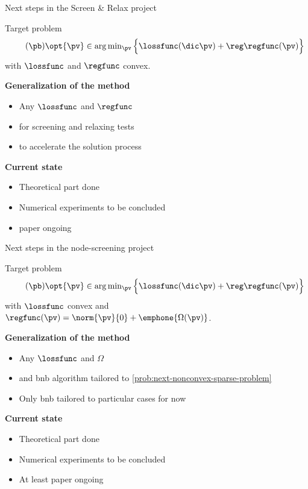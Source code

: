 \begin{frame}{Next steps in the Screen \& Relax project}
  \begin{block}{Target problem}
    \begin{equation}
      \label{prob:next-convex-sparse-problem}
      \tag{$\pb$}
      \opt{\pv} \in \textstyle\arg\min_{\pv} \Big\{ \lossfunc(\dic\pv) + \reg\regfunc(\pv) \Big\}
    \end{equation}
    with $\lossfunc$ and $\regfunc$ convex.
  \end{block}
  \pause
  \textbf{Generalization of the method}
  \begin{itemize}
    \item Any  $\lossfunc$ and $\regfunc$
    \pause
    \item {} for screening and relaxing tests
    \pause
    \item {} to accelerate the solution process
  \end{itemize}
  \pause
  \textbf{Current state}
  \begin{itemize}
    \item Theoretical part done
    \pause
    \item Numerical experiments to be concluded
    \pause
    \item {} paper ongoing
  \end{itemize}
\end{frame}

\begin{frame}{Next steps in the node-screening project}
  \begin{block}{Target problem}
    \begin{equation}
      \label{prob:next-nonconvex-sparse-problem}
      \tag{$\pb$}
      \opt{\pv} \in \textstyle\arg\min_{\pv} \Big\{ \lossfunc(\dic\pv) + \reg\regfunc(\pv) \Big\}
    \end{equation}
    with $\lossfunc$ convex and $\regfunc(\pv) = \norm{\pv}{0} + \emphone{\Omega(\pv)}$.
  \end{block}
  \pause
  \textbf{Generalization of the method}
  \begin{itemize}
    \item Any  $\lossfunc$ and $\Omega$
    \pause
    \item {} and  \gls{bnb} algorithm tailored to \eqref{prob:next-nonconvex-sparse-problem}
    \pause
    \item Only \gls{bnb} tailored to particular cases for now
  \end{itemize}
  \pause
  \textbf{Current state}
  \begin{itemize}
    \item Theoretical part done
    \pause
    \item Numerical experiments to be concluded
    \pause
    \item At least  paper ongoing
  \end{itemize}
\end{frame}
